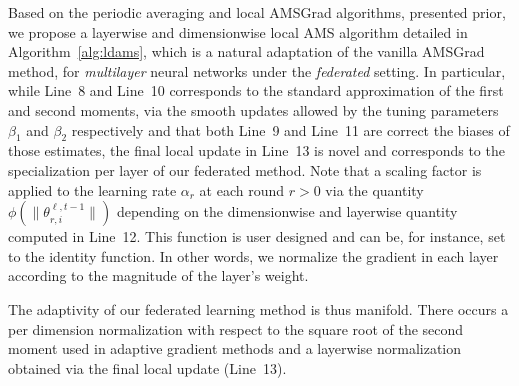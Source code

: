 \documentclass[11pt]{article}
\begin{document}
Based on the periodic averaging and local AMSGrad algorithms, presented prior, we propose a layerwise and dimensionwise local AMS algorithm detailed in Algorithm~\ref{alg:ldams}, which is a natural adaptation of the vanilla AMSGrad method, for \emph{multilayer} neural networks under the \emph{federated} setting.
In particular, while Line~8 and Line~10 corresponds to the standard approximation of the first and second moments, via the smooth updates allowed by the tuning parameters $\beta_1$ and $\beta_2$ respectively and that both Line~9 and Line~11 are correct the biases of those estimates, the final local update in Line~13 is novel and corresponds to the specialization per layer of our federated method.
Note that a scaling factor is applied to the learning rate $\alpha_r$ at each round $r>0$ via the quantity $\phi(\|\theta_{r,i}^{\ell,t-1}\|)$ depending on the dimensionwise and layerwise quantity computed in Line~12.
This function is user designed and can be, for instance, set to the identity function. 
In other words, we normalize the gradient in each layer according to the magnitude of the layer's weight.

The adaptivity of our federated learning method is thus manifold. 
There occurs a per dimension normalization with respect to the square root of the second moment used in adaptive gradient methods and a layerwise normalization obtained via the final local update (Line~13).
\end{document}
